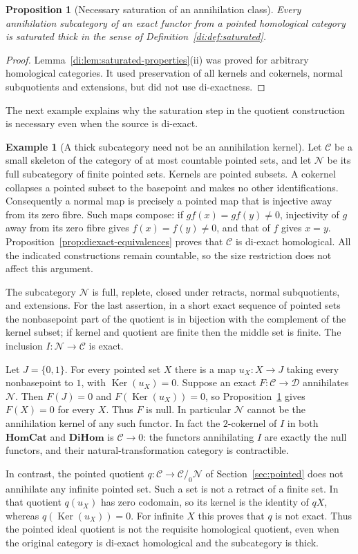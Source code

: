 \documentclass[11pt,reqno,a4paper]{amsart}
\newtheorem{proposition}[theorem]{Proposition}
\theoremstyle{definition}
\newtheorem{example}[theorem]{Example}
\theoremstyle{remark}
\newcommand{\C}{\mathcal{C}}
\newcommand{\D}{\mathcal{D}}
\newcommand{\N}{\mathcal{N}}
\newcommand{\0}{\mathbf{0}}
\renewcommand{\1}{\mathbf{1}}
\newcommand{\HomCat}{\mathbf{HomCat}}
\newcommand{\DiHom}{\mathbf{DiHom}}
\newcommand{\pq}[2]{#1/_{\!0}#2}
\DeclareMathOperator{\Ker}{Ker}
\begin{document}
\begin{proposition}[Necessary saturation of an annihilation class]\label{prop:homcat-saturation}
Every annihilation subcategory of an exact functor from a pointed
homological category is saturated thick in the sense of
Definition~\ref{di:def:saturated}.
\end{proposition}
\begin{proof}
Lemma~\ref{di:lem:saturated-properties}(ii) was proved for arbitrary
homological categories. It used preservation of all kernels and
cokernels, normal subquotients and extensions, but did not use
di-exactness.
\end{proof}

The next example explains why the saturation step in the quotient
construction is necessary even when the source is di-exact.

\begin{example}[A thick subcategory need not be an annihilation kernel]\label{ex:homcat-obstruction}
Let $\C$ be a small skeleton of the category of at most countable
pointed sets, and let $\N$ be its full subcategory of finite pointed
sets. Kernels are pointed subsets. A cokernel collapses a pointed
subset to the basepoint and makes no other identifications.
Consequently a normal map is precisely a pointed map that is
injective away from its zero fibre. Such maps compose: if
$gf(x)=gf(y)\ne0$, injectivity of $g$ away from its zero fibre gives
$f(x)=f(y)\ne0$, and that of $f$ gives $x=y$.
Proposition~\ref{prop:diexact-equivalences} proves that $\C$ is
di-exact homological. All the indicated constructions remain
countable, so the size restriction does not affect this argument.

The subcategory $\N$ is full, replete, closed under retracts,
normal subquotients, and extensions. For the last assertion, in a
short exact sequence of pointed sets the nonbasepoint part of the
quotient is in bijection with the complement of the kernel subset;
if kernel and quotient are finite then the middle set is finite.
The inclusion $I:\N\to\C$ is exact.

Let $J=\{0,1\}$. For every pointed set $X$ there is a map
$u_X:X\to J$ taking every nonbasepoint to $1$, with $\Ker(u_X)=0$.
Suppose an exact $F:\C\to\D$ annihilates $\N$. Then $F(J)=0$
and $F(\Ker(u_X))=0$, so Proposition~\ref{prop:homcat-saturation}
gives $F(X)=0$ for every $X$. Thus $F$ is null. In particular
$\N$ cannot be the annihilation kernel of any such functor.
In fact the $2$-cokernel of $I$ in both $\HomCat$ and $\DiHom$
is $\C\to0$: the functors annihilating $I$ are exactly the null
functors, and their natural-transformation category is contractible.

In contrast, the pointed quotient $q:\C\to\pq{\C}{\N}$ of
Section~\ref{sec:pointed} does not annihilate any infinite pointed
set. Such a set is not a retract of a finite set. In that quotient
$q(u_X)$ has zero codomain, so its kernel is the identity of $qX$,
whereas $q(\Ker(u_X))=0$. For infinite $X$ this proves that $q$
is not exact. Thus the pointed ideal quotient is not the requisite
homological quotient, even when the original category is di-exact
homological and the subcategory is thick.
\end{example}
\end{document}
